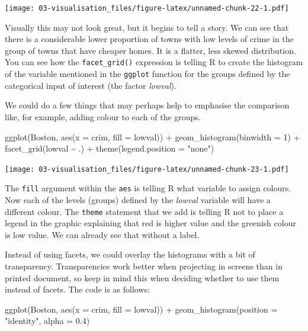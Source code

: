 \documentclass[
]{book}
\newenvironment{Shaded}{\begin{snugshade}}{\end{snugshade}}
\newcommand{\AttributeTok}[1]{\textcolor[rgb]{0.77,0.63,0.00}{#1}}
\newcommand{\DecValTok}[1]{\textcolor[rgb]{0.00,0.00,0.81}{#1}}
\newcommand{\FloatTok}[1]{\textcolor[rgb]{0.00,0.00,0.81}{#1}}
\newcommand{\FunctionTok}[1]{\textcolor[rgb]{0.00,0.00,0.00}{#1}}
\newcommand{\NormalTok}[1]{#1}
\newcommand{\SpecialCharTok}[1]{\textcolor[rgb]{0.00,0.00,0.00}{#1}}
\newcommand{\StringTok}[1]{\textcolor[rgb]{0.31,0.60,0.02}{#1}}
\begin{document}
\texttt{[image: 03-visualisation\_files/figure-latex/unnamed-chunk-22-1.pdf]}

Visually this may not look great, but it begins to tell a story. We can see that there is a considerable lower proportion of towns with low levels of crime in the group of towns that have cheaper homes. It is a flatter, less skewed distribution. You can see how the \texttt{facet\_grid()} expression is telling R to create the histogram of the variable mentioned in the \texttt{ggplot} function for the groups defined by the categorical input of interest (the factor \emph{lowval}).

We could do a few things that may perhaps help to emphasise the comparison like, for example, adding colour to each of the groups.

\begin{Shaded}
\begin{Highlighting}[]
\FunctionTok{ggplot}\NormalTok{(Boston, }\FunctionTok{aes}\NormalTok{(}\AttributeTok{x =}\NormalTok{ crim, }\AttributeTok{fill =}\NormalTok{ lowval)) }\SpecialCharTok{+}
  \FunctionTok{geom\_histogram}\NormalTok{(}\AttributeTok{binwidth =} \DecValTok{1}\NormalTok{) }\SpecialCharTok{+}
  \FunctionTok{facet\_grid}\NormalTok{(lowval }\SpecialCharTok{\textasciitilde{}}\NormalTok{ .) }\SpecialCharTok{+}
  \FunctionTok{theme}\NormalTok{(}\AttributeTok{legend.position =} \StringTok{"none"}\NormalTok{)}
\end{Highlighting}
\end{Shaded}

\texttt{[image: 03-visualisation\_files/figure-latex/unnamed-chunk-23-1.pdf]}

The \texttt{fill} argument within the \texttt{aes} is telling R what variable to assign colours. Now each of the levels (groups) defined by the \emph{lowval} variable will have a different colour. The \texttt{theme} statement that we add is telling R not to place a legend in the graphic explaining that red is higher value and the greenish colour is low value. We can already see that without a label.

Instead of using facets, we could overlay the histograms with a bit of transparency. Transparencies work better when projecting in screens than in printed document, so keep in mind this when deciding whether to use them instead of facets. The code is as follows:

\begin{Shaded}
\begin{Highlighting}[]
\FunctionTok{ggplot}\NormalTok{(Boston, }\FunctionTok{aes}\NormalTok{(}\AttributeTok{x =}\NormalTok{ crim, }\AttributeTok{fill =}\NormalTok{ lowval)) }\SpecialCharTok{+} 
  \FunctionTok{geom\_histogram}\NormalTok{(}\AttributeTok{position =} \StringTok{"identity"}\NormalTok{, }\AttributeTok{alpha =} \FloatTok{0.4}\NormalTok{)}
\end{Highlighting}
\end{Shaded}
\end{document}
